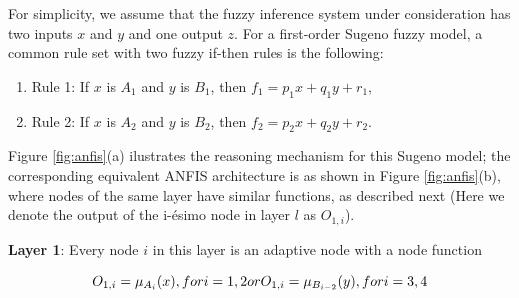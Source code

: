 For simplicity, we assume that the fuzzy inference system under consideration has two inputs $x$ and $y$ and one output $z$. For a first-order Sugeno fuzzy model, a common rule set with two fuzzy if-then rules is the following:

\begin{enumerate}
\item Rule 1: If $x$ is $A_1$ and $y$ is $B_1$, then $f_1 = p_1x + q_1y + r_1,$
\item Rule 2: If $x$ is $A_2$ and $y$ is $B_2$, then $f_2 = p_2x + q_2y + r_2.$
\end{enumerate}

Figure \ref{fig:anfis}(a) ilustrates the reasoning mechanism for this Sugeno model; the corresponding equivalent ANFIS architecture is as shown in Figure \ref{fig:anfis}(b), where nodes of the same layer have similar functions, as described next (Here we denote the output of the i-ésimo node in layer $l$ as $O_{1,i}$).

\textbf{Layer 1}: Every node $i$ in this layer is an adaptive node with a node function

\begin{equation}
\label{eq:layer1anfis}
O_{1,i} = \mu_{A_i}(x), for i = 1,2 or \\
O_{1,i} = \mu_{B_{i-2}}(y), for i = 3,4
\end{equation}

